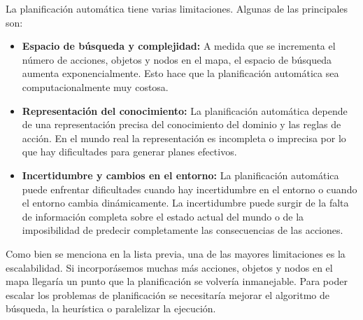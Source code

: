 La planificación automática tiene varias limitaciones. Algunas de las principales son: 
\begin{itemize}
	\item \textbf{Espacio de búsqueda y complejidad:} A medida que se incrementa el número de acciones, objetos y nodos en el mapa, el espacio de búsqueda aumenta exponencialmente. Esto hace que la planificación automática sea computacionalmente muy costosa.
	
	\item \textbf{Representación del conocimiento: } La planificación automática depende de una representación precisa del conocimiento del dominio y las reglas de acción. En el mundo real la representación es incompleta o imprecisa por lo que hay dificultades para generar planes efectivos. 
	
	\item \textbf{Incertidumbre y cambios en el entorno: } La planificación automática puede enfrentar dificultades cuando hay incertidumbre en el entorno o cuando el entorno cambia dinámicamente. La incertidumbre puede surgir de la falta de información completa sobre el estado actual del mundo o de la imposibilidad de predecir completamente las consecuencias de las acciones.
\end{itemize}

Como bien se menciona en la lista previa, una de las mayores limitaciones es la escalabilidad. Si incorporásemos muchas más acciones, objetos y nodos en el mapa llegaría un punto que la planificación se volvería inmanejable. Para poder escalar los problemas de planificación se necesitaría mejorar el algoritmo de búsqueda, la heurística o paralelizar la ejecución.


